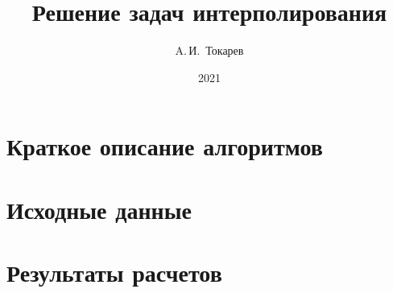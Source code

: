 \documentclass[12pt, a4paper]{article}
\title{Решение задач интерполирования}
\author{A.\,И.~Токарев}
\date{2021}
\begin{document}
\maketitle
\tableofcontents 
\newpage

\section{Краткое описание алгоритмов}



\section{Исходные данные}

\newpage

\section{Результаты расчетов}

\newpage
\end{document}
